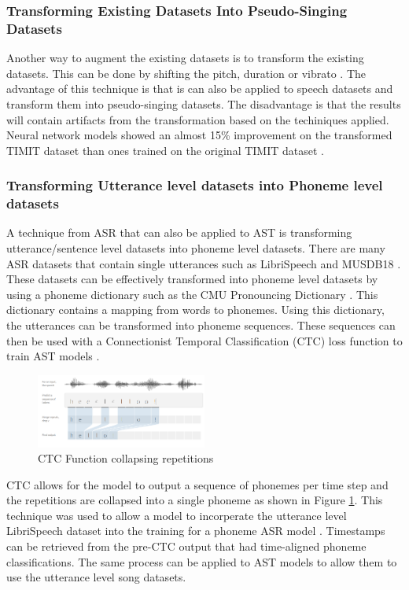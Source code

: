 \documentclass[letterpaper, 12pt]{article}
\begin{document}
\begin{multicols*}{2}

\subsubsection{Transforming Existing Datasets Into Pseudo-Singing Datasets} \label{sec:pseudoSinging}
Another way to augment the existing datasets is to transform the existing datasets. This can be
done by shifting the pitch, duration or vibrato \citep{SongifiedSpeech}. The advantage of this
technique is that is can also be applied to speech datasets and transform them into pseudo-singing
datasets. The disadvantage is that the results will contain artifacts from the transformation based
on the techiniques applied. Neural network models showed an almost 15\% improvement on the
transformed TIMIT dataset than ones trained on the original TIMIT dataset \citep{SongifiedSpeech}.

\subsubsection{Transforming Utterance level datasets into Phoneme level datasets} \label{sec:utteranceToPhoneme}
A technique from ASR that can also be applied to AST is transforming utterance/sentence
level datasets into phoneme level datasets. There are many ASR datasets that contain single utterances
such as LibriSpeech and MUSDB18 \citep{Librispeech,musdb18}. These datasets can be effectively
transformed into phoneme level datasets by using a phoneme dictionary such as the CMU Pronouncing
Dictionary \citep{CMUDict}. This dictionary contains a mapping from words to phonemes. Using this
dictionary, the utterances can be transformed into phoneme sequences. These sequences can then be
used with a Connectionist Temporal Classification (CTC) loss function to train AST models \citep{CTC}.
\begin{figure}
    \centering
    \includegraphics[width=0.5\textwidth]{assets/CTC.png}
    \caption{CTC Function collapsing repetitions \citep{CTC}}
    \label{fig:CTC}
\end{figure}
CTC allows for the model to output a sequence of phonemes per time step and the
repetitions are collapsed into a single phoneme as shown in Figure \ref{fig:CTC}.
This technique was used to allow a model to incorperate the utterance level LibriSpeech
dataset into the training for a phoneme ASR model \citep{wav2vec}. Timestamps can be
retrieved from the pre-CTC output that had time-aligned phoneme classifications.
The same process can be applied to AST models to allow them to use the utterance level song datasets.


\end{multicols*}
\end{document}
